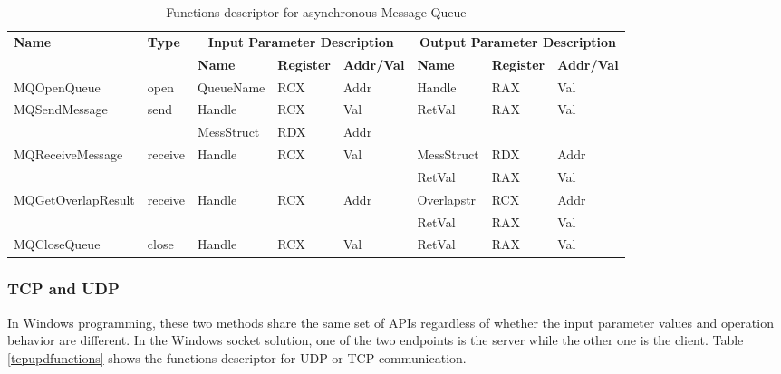 \documentclass[12pt,oneside]{book}
\begin{document}
\begin{table}[H]
  \centering
  \caption{Functions descriptor for asynchronous Message Queue}
  \label{msmqasynfunctions}
\begin{tabular}{|l|l|l|l|l|l|l|l|}
\hline
             \multirow{2}{*}{{\textbf{Name}}} & \multirow{2}{*}{{\textbf{Type}}} & \multicolumn{3}{c|}{\textbf{Input Parameter Description}} & \multicolumn{3}{c|}{\textbf{Output Parameter Description}} \\
              \cline{3-8} 
             & & \textbf{Name}& \textbf{Register} & \textbf{Addr/Val} & \textbf{Name}& \textbf{Register} &  \textbf{Addr/Val}  \\
             \hline
      MQOpenQueue
       &open & QueueName & RCX  & Addr &  Handle & RAX & Val\\
      \hline                     
      \multirow{2}{*}{MQSendMessage}
       &\multirow{2}{*}{send} &  Handle & RCX & Val & \multirow{2}{*}{RetVal} & \multirow{2}{*}{RAX}  & \multirow{2}{*}{Val} \\
       \cline{3-5}
      & & MessStruct& RDX&Addr &   &  &  \\
      \hline            
           \multirow{2}{*}{MQReceiveMessage}
       &\multirow{2}{*}{receive}&  \multirow{2}{*}{Handle} & \multirow{2}{*}{RCX} & \multirow{2}{*}{Val}& MessStruct& RDX&Addr\\
              \cline{6-8}
      & & & & & RetVal & RAX & Val\\
      \hline    
      \multirow{2}{*}{MQGetOverlapResult} &
       \multirow{2}{*}{receive} &  \multirow{2}{*}{Handle} & \multirow{2}{*}{RCX} & \multirow{2}{*}{Addr} & Overlapstr& RCX&Addr\\
                     \cline{6-8}
      & & & & & RetVal & RAX & Val\\
      \hline      
      MQCloseQueue &
       close &  Handle & RCX & Val & RetVal & RAX & Val\\
      \hline                          
  \end{tabular}   
\end{table}


    
\subsubsection{TCP and UDP}
In Windows programming, these two methods share the same set of APIs regardless of whether the input parameter values and operation behavior are different. In the Windows socket solution, one of the two endpoints is the server while the other one is the client. Table \ref{tcpupdfunctions} shows the functions descriptor for UDP or TCP communication. 
\end{document}
